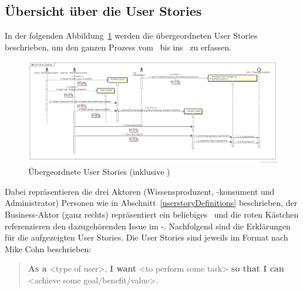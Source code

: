 		
	\begin{landscape}
	\subsection{Übersicht über die User Stories}
	
		In der folgenden Abbildung~\ref{fig:UserStoryDiagram} werden die übergeordneten User Stories beschrieben, um den ganzen Prozess vom \dks\ bis ins \ppt\ zu erfassen.
	
		\begin{figure}[H]
				\includegraphics[width=0.95\linewidth]{media/diagrams/UserStoryDiagram.png}
				\centering
				\caption{Übergeordnete User Stories (inklusive \cdar)}
				\label{fig:UserStoryDiagram}
		\end{figure}
		
		Dabei repräsentieren die drei Aktoren (Wissensproduzent, -konsument und Administrator) Personen wie in Abschnitt~\ref{userstoryDefinitions} beschrieben,
		der Business-Aktor (ganz rechts) repräsentiert ein beliebiges \ppt\ und die roten Kästchen referenzieren den dazugehörenden Issue im \eeppi-\ppt.
		Nachfolgend sind die Erklärungen für die aufgezeigten User Stories.
		Die User Stories sind jeweils im Format nach Mike Cohn \cite{rasmusson_agile_2012} beschrieben:
		\begin{quote}
			\textbf{As a} <type of user>,\newline
			\textbf{I want} <to perform some task>\newline
			\textbf{so that I can} <achieve some goal/benefit/value>.
		\end{quote}
	\end{landscape}
	
		
			
		
			
